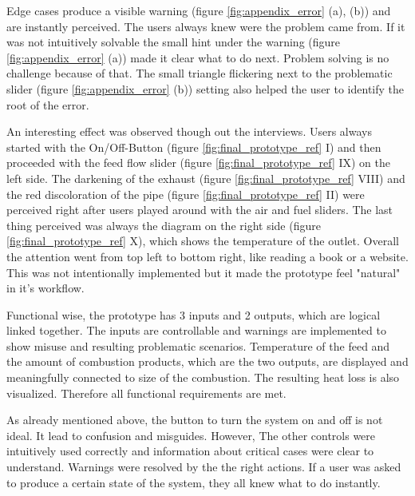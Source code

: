 Edge cases produce a visible warning (figure \ref{fig:appendix_error} (a), (b)) and are instantly perceived. The users always knew were the problem came from. If it was not intuitively solvable the small hint under the warning (figure \ref{fig:appendix_error} (a)) made it clear what to do next. Problem solving is no challenge because of that. The small triangle flickering next to the problematic slider (figure \ref{fig:appendix_error} (b)) setting also helped the user to identify the root of the error.

An interesting effect was observed though out the interviews. Users always started with the On/Off-Button (figure \ref{fig:final_prototype_ref} I) and then proceeded with the feed flow slider (figure \ref{fig:final_prototype_ref} IX) on the left side. The darkening of the exhaust (figure \ref{fig:final_prototype_ref} VIII) and the red discoloration of the pipe (figure \ref{fig:final_prototype_ref} II) were perceived right after users played around with the air and fuel sliders. The last thing perceived was always the diagram on the right side (figure \ref{fig:final_prototype_ref} X), which shows the temperature of the outlet. Overall the attention went from top left to bottom right, like reading a book or a website. This was not intentionally implemented but it made the prototype feel "natural" in it's workflow.

Functional wise, the prototype has 3 inputs and 2 outputs, which are logical linked together. The inputs are controllable and warnings are implemented to show misuse and resulting problematic scenarios. Temperature of the feed and the amount of combustion products, which are the two outputs, are displayed and meaningfully connected to size of the combustion. The resulting heat loss is also visualized. Therefore all functional requirements are met.

As already mentioned above, the button to turn the system on and off is not ideal. It lead to confusion and misguides. However, The other controls were intuitively used correctly and information about critical cases were clear to understand. Warnings were resolved by the the right actions. If a user was asked to produce a certain state of the system, they all knew what to do instantly. 